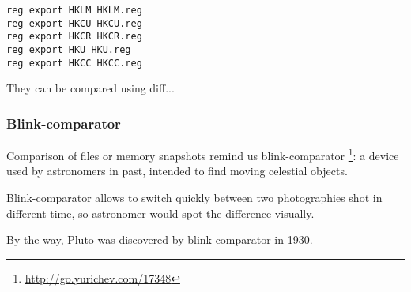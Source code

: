 \begin{lstlisting}
reg export HKLM HKLM.reg
reg export HKCU HKCU.reg
reg export HKCR HKCR.reg
reg export HKU HKU.reg
reg export HKCC HKCC.reg
\end{lstlisting}

They can be compared using diff...

\subsubsection{Blink-comparator}

Comparison of files or memory snapshots remind us blink-comparator
\footnote{\url{http://go.yurichev.com/17348}}:
a device used by astronomers in past, intended to find moving celestial objects.

Blink-comparator allows to switch quickly between two photographies shot in different time,
so astronomer would spot the difference visually.

By the way, Pluto was discovered by blink-comparator in 1930.
